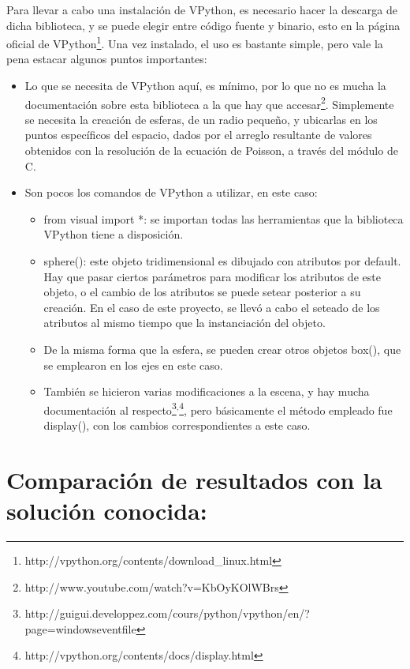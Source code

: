 \documentclass[letter]{article}
\begin{document}
Para llevar a cabo una instalación de VPython, es necesario hacer la descarga de dicha biblioteca, y se puede elegir entre código fuente y binario, esto en la página oficial de VPython\footnote{http://vpython.org/contents/download\_linux.html}. Una vez instalado, el uso es bastante simple, pero vale la pena estacar algunos puntos importantes:

\begin{itemize}
\item Lo que se necesita de VPython aquí, es mínimo, por lo que no es mucha la documentación sobre esta biblioteca a la que hay que accesar\footnote{http://www.youtube.com/watch?v=KbOyKOlWBrs}. Simplemente se necesita la creación de esferas, de un radio pequeño, y ubicarlas en los puntos específicos del espacio, dados por el arreglo resultante de valores obtenidos con la resolución de la ecuación de Poisson, a través del módulo de C.
\item Son pocos los comandos de VPython a utilizar, en este caso:
\begin{itemize}
\item from visual import *: se importan todas las herramientas que la biblioteca VPython tiene a disposición.
\item sphere(): este objeto tridimensional es dibujado con atributos por default. Hay que pasar ciertos parámetros para modificar los atributos de este objeto, o el cambio de los atributos se puede setear posterior a su creación. En el caso de este proyecto, se llevó a cabo el seteado de los atributos al mismo tiempo que la instanciación del objeto.
\item De la misma forma que la esfera, se pueden crear otros objetos box(), que se emplearon en los ejes en este caso.
\item También se hicieron varias modificaciones a la escena, y hay mucha documentación al respecto\footnote{http://guigui.developpez.com/cours/python/vpython/en/?page=windowseventfile}$\displaystyle ^{,}$\footnote{http://vpython.org/contents/docs/display.html}, pero básicamente el método empleado fue display(), con los cambios correspondientes a este caso.
\end{itemize}
\end{itemize}



\section{Comparación de resultados con la solución conocida:}
\end{document}
